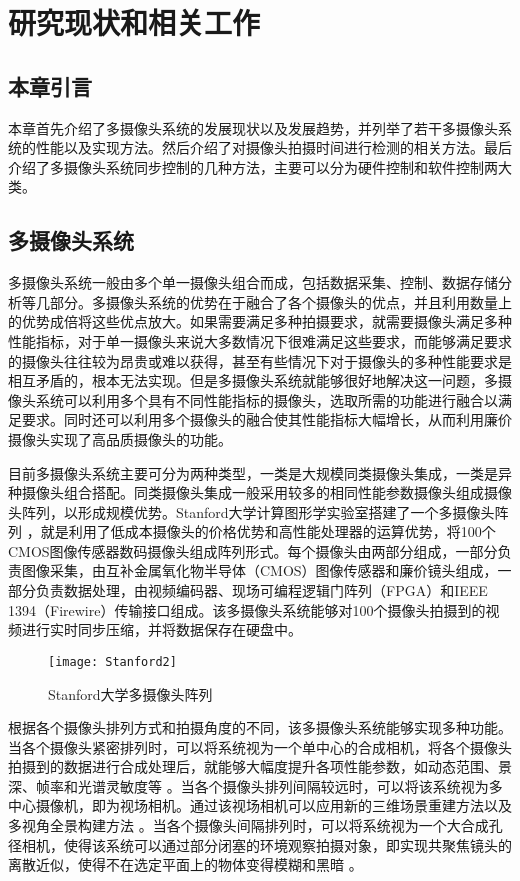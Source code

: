 \chapter{研究现状和相关工作}

\section{本章引言}

本章首先介绍了多摄像头系统的发展现状以及发展趋势，并列举了若干多摄像头系统的性能以及实现方法。然后介绍了对摄像头拍摄时间进行检测的相关方法。最后介绍了多摄像头系统同步控制的几种方法，主要可以分为硬件控制和软件控制两大类。

\section{多摄像头系统}

多摄像头系统一般由多个单一摄像头组合而成，包括数据采集、控制、数据存储分析等几部分。多摄像头系统的优势在于融合了各个摄像头的优点，并且利用数量上的优势成倍将这些优点放大。如果需要满足多种拍摄要求，就需要摄像头满足多种性能指标，对于单一摄像头来说大多数情况下很难满足这些要求，而能够满足要求的摄像头往往较为昂贵或难以获得，甚至有些情况下对于摄像头的多种性能要求是相互矛盾的，根本无法实现。但是多摄像头系统就能够很好地解决这一问题，多摄像头系统可以利用多个具有不同性能指标的摄像头，选取所需的功能进行融合以满足要求。同时还可以利用多个摄像头的融合使其性能指标大幅增长，从而利用廉价摄像头实现了高品质摄像头的功能。

目前多摄像头系统主要可分为两种类型，一类是大规模同类摄像头集成，一类是异种摄像头组合搭配。同类摄像头集成一般采用较多的相同性能参数摄像头组成摄像头阵列，以形成规模优势。Stanford大学计算图形学实验室搭建了一个多摄像头阵列 \cite{3}，就是利用了低成本摄像头的价格优势和高性能处理器的运算优势，将100个CMOS图像传感器数码摄像头组成阵列形式。每个摄像头由两部分组成，一部分负责图像采集，由互补金属氧化物半导体（CMOS）图像传感器和廉价镜头组成，一部分负责数据处理，由视频编码器、现场可编程逻辑门阵列（FPGA）和IEEE 1394（Firewire）传输接口组成。该多摄像头系统能够对100个摄像头拍摄到的视频进行实时同步压缩，并将数据保存在硬盘中。

\begin{figure}[h] 
  \centering
  \texttt{[image: Stanford2]}
  \caption{Stanford大学多摄像头阵列}
  \label{Stanford2}
\end{figure}

根据各个摄像头排列方式和拍摄角度的不同，该多摄像头系统能够实现多种功能。当各个摄像头紧密排列时，可以将系统视为一个单中心的合成相机，将各个摄像头拍摄到的数据进行合成处理后，就能够大幅度提升各项性能参数，如动态范围、景深、帧率和光谱灵敏度等 \cite{4, 7}。当各个摄像头排列间隔较远时，可以将该系统视为多中心摄像机，即为视场相机。通过该视场相机可以应用新的三维场景重建方法以及多视角全景构建方法 \cite{5}。当各个摄像头间隔排列时，可以将系统视为一个大合成孔径相机，使得该系统可以通过部分闭塞的环境观察拍摄对象，即实现共聚焦镜头的离散近似，使得不在选定平面上的物体变得模糊和黑暗 \cite{6, 8}。

